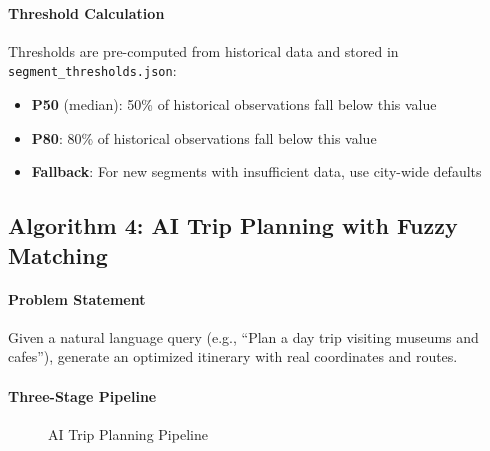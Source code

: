 \paragraph{Threshold Calculation}
Thresholds are pre-computed from historical data and stored in \texttt{segment\_thresholds.json}:
\begin{itemize}[noitemsep]
    \item \textbf{P50} (median): 50\% of historical observations fall below this value
    \item \textbf{P80}: 80\% of historical observations fall below this value
    \item \textbf{Fallback}: For new segments with insufficient data, use city-wide defaults
\end{itemize}

\newpage
\subsection{Algorithm 4: AI Trip Planning with Fuzzy Matching}

\paragraph{Problem Statement}
Given a natural language query (e.g., ``Plan a day trip visiting museums and cafes''), generate an optimized itinerary with real coordinates and routes.

\paragraph{Three-Stage Pipeline}

\begin{figure}[H]
    \centering
    \caption{AI Trip Planning Pipeline}
\end{figure}

